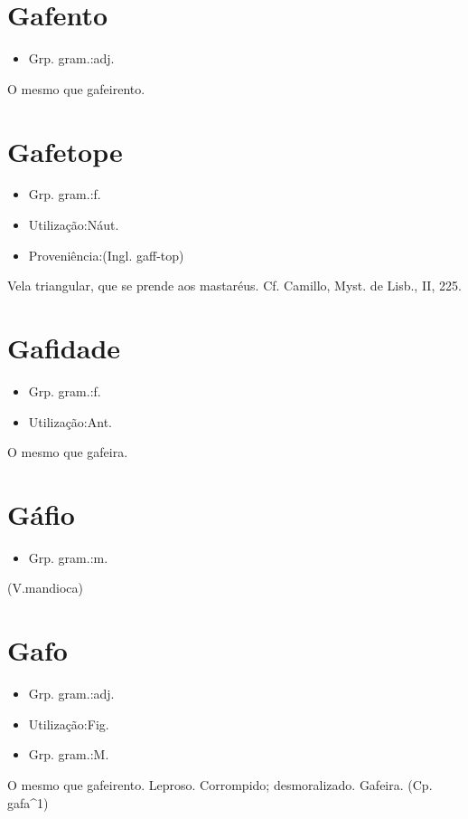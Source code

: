 \section{Gafento}
\begin{itemize}
\item {Grp. gram.:adj.}
\end{itemize}
O mesmo que \textunderscore gafeirento\textunderscore .
\section{Gafetope}
\begin{itemize}
\item {Grp. gram.:f.}
\end{itemize}
\begin{itemize}
\item {Utilização:Náut.}
\end{itemize}
\begin{itemize}
\item {Proveniência:(Ingl. \textunderscore gaff-top\textunderscore )}
\end{itemize}
Vela triangular, que se prende aos mastaréus. Cf. Camillo, \textunderscore Myst. de Lisb.\textunderscore , II, 225.
\section{Gafidade}
\begin{itemize}
\item {Grp. gram.:f.}
\end{itemize}
\begin{itemize}
\item {Utilização:Ant.}
\end{itemize}
O mesmo que \textunderscore gafeira\textunderscore .
\section{Gáfio}
\begin{itemize}
\item {Grp. gram.:m.}
\end{itemize}
(V.mandioca)
\section{Gafo}
\begin{itemize}
\item {Grp. gram.:adj.}
\end{itemize}
\begin{itemize}
\item {Utilização:Fig.}
\end{itemize}
\begin{itemize}
\item {Grp. gram.:M.}
\end{itemize}
O mesmo que \textunderscore gafeirento\textunderscore .
Leproso.
Corrompido; desmoralizado.
Gafeira.
(Cp. \textunderscore gafa\textunderscore ^1)
